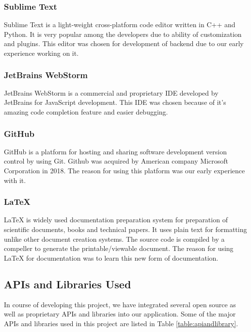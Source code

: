 \documentclass[12pt, a4paper, oneside]{article}
\begin{document}
\subsubsection{Sublime Text}
Sublime Text is a light-weight cross-platform code editor written in C++ and Python. It is very popular among the developers due to ability of customization and plugins. This editor was chosen for development of backend due to our early experience working on it.

\subsubsection{JetBrains WebStorm}
JetBrains WebStorm is a commercial and proprietary IDE developed by JetBrains for JavaScript development. This IDE was chosen because of it's amazing code completion feature and easier debugging.

\subsubsection{GitHub}
GitHub is a platform for hosting and sharing software development version control by using Git. Github was acquired by American company Microsoft Corporation in 2018. The reason for using this platform was our early experience with it. 

\subsubsection{LaTeX}
LaTeX is widely used documentation preparation system for preparation of scientific documents, books and technical papers. It uses plain text for formatting unlike other document creation systems. The source code is compiled by a compeller to generate the printable/viewable document. The reason for using LaTeX for documentation was to learn this new form of documentation.


\subsection{APIs and Libraries Used}
In course of developing this project, we have integrated several open source as well as proprietary APIs and libraries into our application. Some of the major APIs and libraries used in this project are listed in Table \ref{table:apiandlibrary}.
\end{document}
